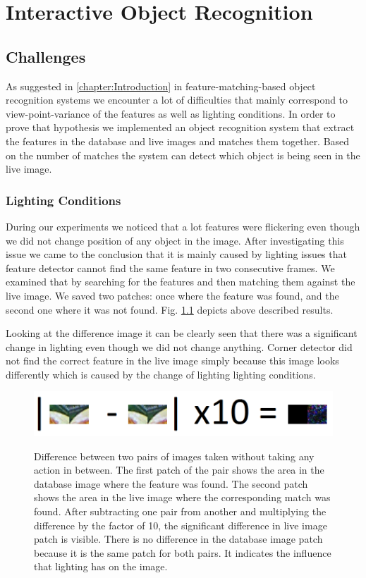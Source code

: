 \chapter{Interactive Object Recognition}
\label{chapter:Object Recognition}

\section{Challenges}
As suggested in \ref{chapter:Introduction} in feature-matching-based object recognition systems we encounter a lot of difficulties that mainly correspond to view-point-variance of the features as well as lighting conditions. In order to prove that hypothesis we implemented an object recognition system that extract the features in the database and live images and matches them together. Based on the number of matches the system can detect which object is being seen in the live image.

\subsection{Lighting Conditions}

During our experiments we noticed that a lot features were flickering even though we did not change position of any object in the image. After investigating this issue we came to the conclusion that it is mainly caused by lighting issues that feature detector cannot find the same feature in two consecutive frames. We examined that by searching for the features and then matching them against the live image. We saved two patches: once where the feature was found, and the second one where it was not found. Fig. \ref{fig:patches} depicts above described results.

Looking at the difference image it can be clearly seen that there was a significant change in lighting even though we did not change anything. Corner detector did not find the correct feature in the live image simply because this image looks differently which is caused by the change of lighting lighting conditions.

\begin{figure}

{\includegraphics[width=1\columnwidth]{figures/patches.png}}

\caption{Difference between two pairs of images taken without taking any action in between. The first patch of the pair shows the area in the database image where the feature was found. The second patch shows the area in the live image where the corresponding match was found. After subtracting one pair from another and multiplying the difference by the factor of 10, the significant difference in live image patch is visible. There is no difference in the database image patch because it is the same patch for both pairs.  It indicates the influence that lighting has on the image. }
\label{fig:patches}
\end{figure}

